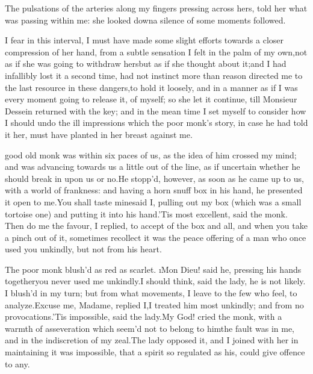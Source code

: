 \documentclass[twoside]{article}
\begin{document}
The pulsations of the arteries along my fingers pressing across hers,
told her what was passing within me: she looked down\tsk a silence of some
moments followed.

I fear in this interval, I must have made some slight efforts towards a
closer compression of her hand, from a subtle sensation I felt in the
palm of my own,\tsk not as if she was going to withdraw hers\tsk but as if she
thought about it;\tsk and I had infallibly lost it a second time, had not
instinct more than reason directed me to the last resource in these
dangers,\tsk to hold it loosely, and in a manner as if I was every moment
going to release it, of myself; so she let it continue, till Monsieur
Dessein returned with the key; and in the mean time I set myself to
consider how I should undo the ill impressions which the poor monk’s
story, in case he had told it her, must have planted in her breast
against me.






 good old monk was within six paces of us, as the idea of him crossed
my mind; and was advancing towards us a little out of the line, as if
uncertain whether he should break in upon us or no.\tsk He stopp’d, however,
as soon as he came up to us, with a world of frankness: and having a horn
snuff box in his hand, he presented it open to me.\tsk You shall taste
mine\tsk said I, pulling out my box (which was a small tortoise one) and
putting it into his hand.\tsk ’Tis most excellent, said the monk.  Then do me
the favour, I replied, to accept of the box and all, and when you take a
pinch out of it, sometimes recollect it was the peace offering of a man
who once used you unkindly, but not from his heart.

The poor monk blush’d as red as scarlet.  \i{Mon Dieu}! said he, pressing
his hands together\tsk you never used me unkindly.\tsk I should think, said the
lady, he is not likely.  I blush’d in my turn; but from what movements, I
leave to the few who feel, to analyze.\tsk Excuse me, Madame, replied I,\tsk I
treated him most unkindly; and from no provocations.\tsk ’Tis impossible,
said the lady.\tsk My God! cried the monk, with a warmth of asseveration
which seem’d not to belong to him\tsk the fault was in me, and in the
indiscretion of my zeal.\tsk The lady opposed it, and I joined with her in
maintaining it was impossible, that a spirit so regulated as his, could
give offence to any.
\end{document}
